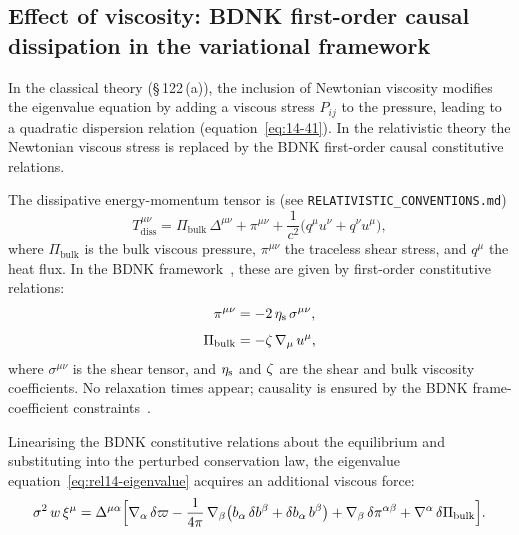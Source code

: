 \subsection{Effect of viscosity: BDNK first-order causal dissipation in
  the variational framework}\label{sec:rel-122-viscosity}

In the classical theory (\S\,122\,(a)), the inclusion of Newtonian
viscosity modifies the eigenvalue equation by adding a viscous stress
$P_{ij}$ to the pressure, leading to a quadratic dispersion relation
(equation~\eqref{eq:14-41}).  In the relativistic theory the
Newtonian viscous stress is replaced by the BDNK first-order causal
constitutive relations.

The dissipative energy-momentum tensor is (see \texttt{RELATIVISTIC\_CONVENTIONS.md})
\begin{equation}
  T^{\mu\nu}_{\mathrm{diss}}
  = \Pi_{\mathrm{bulk}}\,\Delta^{\mu\nu}
  + \pi^{\mu\nu}
  + \frac{1}{c^{2}}\bigl(q^{\mu}u^{\nu} + q^{\nu}u^{\mu}\bigr),
  \label{eq:rel14-Tdiss}
\end{equation}
where $\Pi_{\mathrm{bulk}}$ is the bulk viscous pressure,
$\pi^{\mu\nu}$ the traceless shear stress, and $q^{\mu}$ the heat
flux.  In the BDNK framework~\cite{BemficaDN2018,Kovtun2019,BemficaDN2019},
these are given by first-order constitutive relations:
\begin{align}
  \pi^{\mu\nu}
  &= -2\,\eta_{\mathrm{s}}\,\sigma^{\mu\nu},
  \label{eq:rel14-IS-shear}\\[4pt]
  \Pi_{\mathrm{bulk}}
  &= -\zeta\,\nabla_{\mu}\,u^{\mu},
  \label{eq:rel14-IS-bulk}
\end{align}
where $\sigma^{\mu\nu}$ is the shear tensor, and $\eta_{\mathrm{s}}$ and
$\zeta$ are the shear and bulk viscosity coefficients.  No
relaxation times appear; causality is ensured by the BDNK
frame-coefficient constraints~\cite{BemficaDNK2023,HoultKovtun2020}.

Linearising the BDNK constitutive relations about the equilibrium and
substituting into the perturbed conservation law, the eigenvalue
equation~\eqref{eq:rel14-eigenvalue} acquires an additional viscous
force:
\begin{equation}
  \sigma^{2}\,w\,\xi^{\mu}
  = \Delta^{\mu\alpha}\Bigl[
      \nabla_{\alpha}\,\delta\varpi
    - \frac{1}{4\pi}\,\nabla_{\beta}
      \bigl(b_{\alpha}\,\delta b^{\beta}
        + \delta b_{\alpha}\,b^{\beta}\bigr)
    + \nabla_{\beta}\,\delta\pi^{\alpha\beta}
    + \nabla^{\alpha}\,\delta\Pi_{\mathrm{bulk}}
    \Bigr].
  \label{eq:rel14-eigenvalue-visc}
\end{equation}

